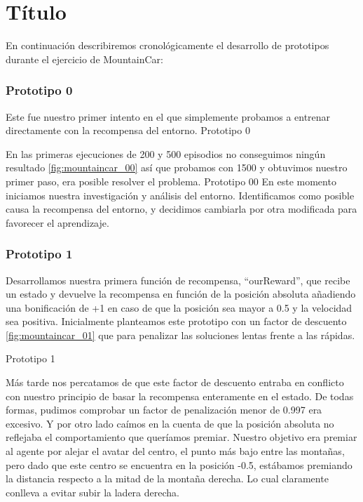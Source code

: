 
\chapter{Título}
\label{Appendix:Key1}

En continuación describiremos cronológicamente el desarrollo de prototipos durante el ejercicio de MountainCar:

\subsection{Prototipo 0}
 Este fue nuestro primer intento en el que simplemente probamos a entrenar directamente con la recompensa del entorno.
       {Prototipo 0}

 En las primeras ejecuciones de 200 y 500 episodios no conseguimos ningún resultado \ref{fig:mountaincar_00} así que probamos con 1500 y obtuvimos nuestro primer paso, era posible resolver el problema.
        {Prototipo 00}
 En este momento iniciamos nuestra investigación y análisis del entorno. Identificamos como posible causa la recompensa del entorno, y decidimos cambiarla por otra modificada para favorecer el aprendizaje.

\subsection{Prototipo 1}
 Desarrollamos nuestra primera función de recompensa, ``ourReward'', que recibe un estado y devuelve la recompensa en función de la posición absoluta añadiendo una bonificación de +1 en caso de que la posición sea mayor a 0.5 y la velocidad sea positiva. Inicialmente planteamos este prototipo con un factor de descuento \ref{fig:mountaincar_01} que para penalizar las soluciones lentas frente a las rápidas.
 
       {Prototipo 1}

 Más tarde nos percatamos de que este factor de descuento entraba en conflicto con nuestro principio de basar la recompensa enteramente en el estado. De todas formas, pudimos comprobar un factor de penalización menor de 0.997 era excesivo. Y por otro lado caímos en la cuenta de que la posición absoluta no reflejaba el comportamiento que queríamos premiar. Nuestro objetivo era premiar al agente por alejar el avatar del centro, el punto más bajo entre las montañas, pero dado que este centro se encuentra en la posición -0.5, estábamos premiando la distancia respecto a la mitad de la montaña derecha. Lo cual claramente conlleva a evitar subir la ladera derecha.

